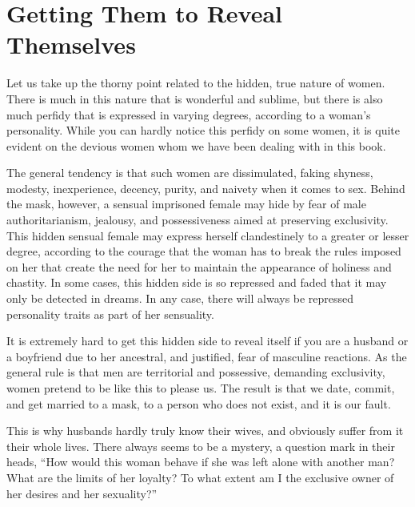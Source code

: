 \section{Getting Them to Reveal Themselves}

\par Let us take up the thorny point related to the hidden, true nature of women. There is much in this nature that is wonderful and sublime, but there is also much perfidy that is expressed in varying degrees, according to a woman's personality. While you can hardly notice this perfidy on some women, it is quite evident on the devious women whom we have been dealing with in this book.

\par The general tendency is that such women are dissimulated, faking shyness, modesty, inexperience, decency, purity, and naivety when it comes to sex. Behind the mask, however, a sensual imprisoned female may hide by fear of male authoritarianism, jealousy, and possessiveness aimed at preserving exclusivity. This hidden sensual female may express herself clandestinely to a greater or lesser degree, according to the courage that the woman has to break the rules imposed on her that create the need for her to maintain the appearance of holiness and chastity. In some cases, this hidden side is so repressed and faded that it may only be detected in dreams. In any case, there will always be repressed personality traits as part of her sensuality.

\par It is extremely hard to get this hidden side to reveal itself if you are a husband or a boyfriend due to her ancestral, and justified, fear of masculine reactions. As the general rule is that men are territorial and possessive, demanding exclusivity\footnotemark[41], women pretend to be like this to please us. The result is that we date, commit, and get married to a mask, to a person who does not exist, and it is our fault.


\par This is why husbands hardly truly know their wives, and obviously suffer from it their whole lives. There always seems to be a mystery, a question mark in their heads, \enquote{How would this woman behave if she was left alone with another man? What are the limits of her loyalty? To what extent am I the exclusive owner of her desires and her sexuality?}

